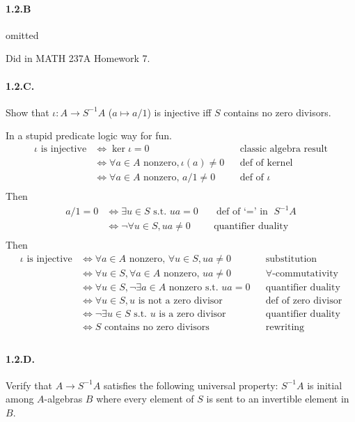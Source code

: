 \documentclass[12pt]{article}
\newlength{\myparskip}
\newenvironment{fullbox}{\begin{lrbox}{\savefullbox}\begin{minipage}{\dimexpr\textwidth-2\fboxsep\relax}\setlength{\parskip}{\myparskip}}{\end{minipage}\end{lrbox}\framebox[\textwidth]{\usebox{\savefullbox}}}
\newenvironment{pbox}[1][]{\begin{fullbox}\def\temp{#1}\ifx\temp\empty\else\paragraph{#1}\phantom{}\fi}{\end{fullbox}}
\theoremstyle{definition}
\newcommand{\<}{\langle}
\renewcommand{\>}{\rangle}
\begin{document}
\begin{pbox}[1.2.B]
    omitted
\end{pbox}

Did in MATH 237A Homework 7.

\begin{pbox}[1.2.C.]
    Show that $\iota : A \to S^{-1}A$ ($a \mapsto a/1$) is injective iff $S$ contains no zero divisors.
\end{pbox}

In a stupid predicate logic way for fun.
\begin{align*}
    \iota \text{ is injective}
        &\iff \ker\iota = 0 && \text{classic algebra result} \\
        &\iff \forall a \in A \text{ nonzero}, \iota(a) \ne 0 && \text{def of kernel} \\
        &\iff \forall a \in A \text{ nonzero, } a/1 \ne 0 && \text{def of } \iota \\
\end{align*}
Then
\begin{align*}
    a/1 = 0
        &\iff \exists u \in S \text{ s.t. } ua = 0 && \text{def of `$=$' in } S^{-1}A \\
        &\iff \lnot\forall u \in S, ua \ne 0 && \text{quantifier duality} \\
\end{align*}
Then
\begin{align*}
    \iota \text{ is injective} 
        &\iff \forall a \in A \text{ nonzero, } \forall u \in S, ua \ne 0 
            && \text{substitution} \\
        &\iff \forall u \in S, \forall a \in A \text{ nonzero, } ua \ne 0 
            && \text{$\forall$-commutativity}\\
        &\iff \forall u \in S, \lnot\exists a \in A \text{ nonzero s.t. } ua = 0 
            && \text{quantifier duality} \\
        &\iff \forall u \in S, u \text{ is not a zero divisor} 
            && \text{def of zero divisor} \\
        &\iff \lnot\exists u \in S \text{ s.t. } u \text{ is a zero divisor} 
            && \text{quantifier duality} \\
        &\iff S \text{ contains no zero divisors}
            && \text{rewriting} \\
\end{align*}


\begin{pbox}[1.2.D.]
    Verify that $A \to S^{-1}A$ satisfies the following universal property: $S^{-1}A$ is initial among $A$-algebras $B$ where every element of $S$ is sent to an invertible element in $B$.
\end{pbox}
\end{document}
